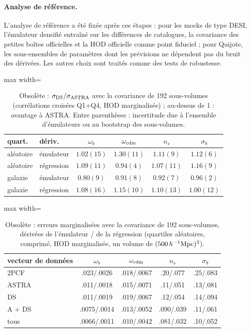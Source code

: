 \paragraph{Analyse de référence.} L'analyse de référence a été fixée après ces étapes : pour les mocks de type DESI, l'émulateur densifié entraîné sur les différences de catalogues, la covariance des petites boîtes officielles et la HOD officielle comme point fiduciel ; pour Quijote, les sous-ensembles de paramètres dont les prévisions ne dépendent pas du bruit des dérivées. Les autres choix sont traités comme des tests de robustesse.

\begin{table}[!htbp]
\centering\small
\begin{adjustbox}{max width=\linewidth}
\begin{tabular}{llcccc}
\toprule
quart. & dériv. & $\omega_b$ & $\omega_{\rm cdm}$ & $n_s$ & $\sigma_8$ \\
\midrule
aléatoire & émulateur & $1.02(15)$ & $1.30(11)$ & $1.11(9)$ & $1.12(6)$ \\
aléatoire & régression & $1.09(11)$ & $0.94(4)$ & $1.07(11)$ & $1.16(9)$ \\
galaxie & émulateur & $0.80(9)$ & $0.91(8)$ & $0.92(7)$ & $0.96(2)$ \\
galaxie & régression & $1.08(16)$ & $1.15(10)$ & $1.10(13)$ & $1.00(12)$ \\
\bottomrule
\end{tabular}
\end{adjustbox}
\caption{Obsolète : $\sigma_{\rm DS}/\sigma_{\rm ASTRA}$ avec la covariance de 192 sous-volumes (corrélations croisées Q1+Q4, HOD marginalisée) ; au-dessus de 1 : avantage à ASTRA. Entre parenthèses : incertitude due à l'ensemble d'émulateurs ou au bootstrap des sous-volumes.}
\label{tab:ratio}
\end{table}

\begin{table}[!htbp]
\centering\small
\begin{adjustbox}{max width=\linewidth}
\begin{tabular}{lcccc}
\toprule
vecteur de données & $\omega_b$ & $\omega_{\rm cdm}$ & $n_s$ & $\sigma_8$ \\
\midrule
2PCF & .023/.0026 & .018/.0067 & .20/.077 & .25/.083 \\
ASTRA & .011/.0018 & .015/.0071 & .11/.051 & .13/.081 \\
DS & .011/.0019 & .019/.0067 & .12/.054 & .14/.094 \\
A + DS & .0075/.0014 & .013/.0052 & .090/.039 & .11/.061 \\
tous & .0066/.0011 & .010/.0042 & .081/.032 & .10/.052 \\
\bottomrule
\end{tabular}
\end{adjustbox}
\caption{Obsolète : erreurs marginalisées avec la covariance de 192 sous-volumes, dérivées de l'émulateur / de la régression (quartiles aléatoires, comprimé, HOD marginalisée, un volume de $(500\,h^{-1}\mathrm{Mpc})^3$).}
\label{tab:sigma_sub}
\end{table}

